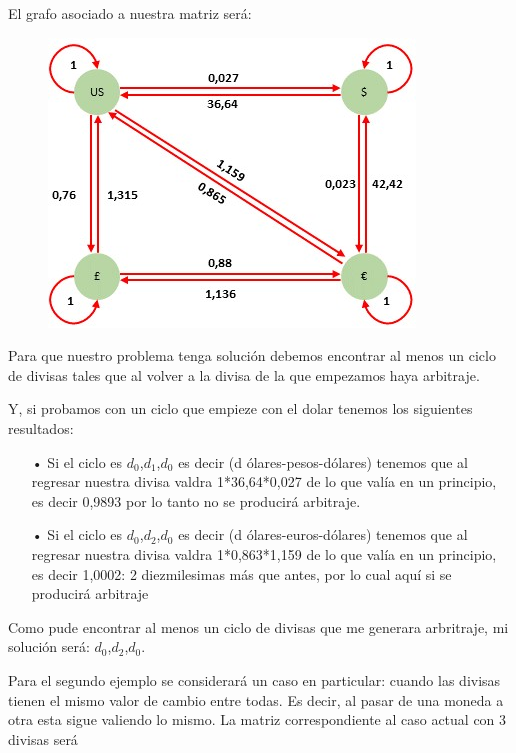 \documentclass[11pt,a4paper]{article}
\begin{document}
El grafo asociado a nuestra matriz ser\'a:

\begin{figure}[h]
\centering 
\includegraphics{Grafoejemplo2.jpg}
\end{figure}

Para que nuestro problema tenga soluci\'on debemos encontrar al menos un ciclo de divisas tales que al volver a la divisa de la que empezamos haya arbitraje.

Y, si probamos con un ciclo que empieze con  el dolar tenemos los siguientes resultados:
\begin{itemize}
    \item[•] Si el ciclo es {$d_{0}$,$d_{1}$,$d_{0}$} es decir (d  \'olares-pesos-d\'olares) tenemos que al regresar nuestra divisa valdra 1*36,64*0,027 de lo que val\'ia en un principio, es decir 0,9893 por lo tanto no se producir\'a arbitraje.
    \item[•] Si el ciclo es {$d_{0}$,$d_{2}$,$d_{0}$} es decir (d  \'olares-euros-d\'olares) tenemos que al regresar nuestra divisa valdra 1*0,863*1,159 de lo que val\'ia en un principio, es decir 1,0002: 2 diezmilesimas m\'as que antes, por lo cual aqu\'i si se producir\'a arbitraje
\end{itemize}

Como pude encontrar al menos un ciclo de divisas que me generara arbritraje, mi soluci\'on ser\'a: $d_{0}$,$d_{2}$,$d_{0}$.
\\


Para el segundo ejemplo se considerar\'a un caso en particular: cuando las divisas tienen el mismo valor de cambio entre todas. Es decir, al pasar de una moneda a otra esta sigue valiendo lo mismo. La matriz correspondiente al caso actual con 3 divisas ser\'a
\end{document}
